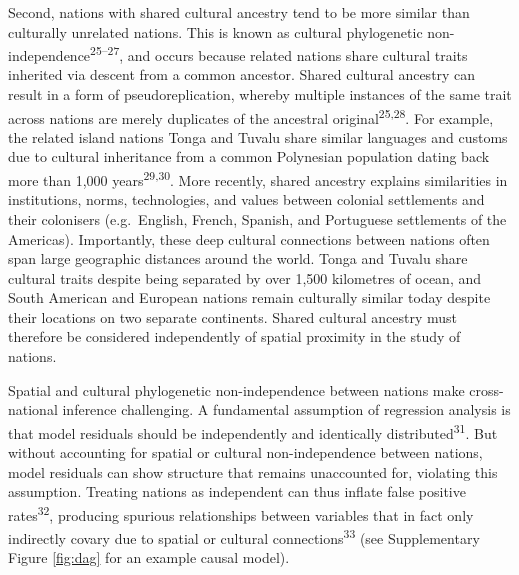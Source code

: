 \documentclass[
  man,floatsintext]{apa6}
\begin{document}
Second, nations with shared cultural ancestry tend to be more similar than culturally unrelated nations. This is known as cultural phylogenetic non-independence\textsuperscript{25--27}, and occurs because related nations share cultural traits inherited via descent from a common ancestor. Shared cultural ancestry can result in a form of pseudoreplication, whereby multiple instances of the same trait across nations are merely duplicates of the ancestral original\textsuperscript{25,28}. For example, the related island nations Tonga and Tuvalu share similar languages and customs due to cultural inheritance from a common Polynesian population dating back more than 1,000 years\textsuperscript{29,30}. More recently, shared ancestry explains similarities in institutions, norms, technologies, and values between colonial settlements and their colonisers (e.g.~English, French, Spanish, and Portuguese settlements of the Americas). Importantly, these deep cultural connections between nations often span large geographic distances around the world. Tonga and Tuvalu share cultural traits despite being separated by over 1,500 kilometres of ocean, and South American and European nations remain culturally similar today despite their locations on two separate continents. Shared cultural ancestry must therefore be considered independently of spatial proximity in the study of nations.

Spatial and cultural phylogenetic non-independence between nations make cross-national inference challenging. A fundamental assumption of regression analysis is that model residuals should be independently and identically distributed\textsuperscript{31}. But without accounting for spatial or cultural non-independence between nations, model residuals can show structure that remains unaccounted for, violating this assumption. Treating nations as independent can thus inflate false positive rates\textsuperscript{32}, producing spurious relationships between variables that in fact only indirectly covary due to spatial or cultural connections\textsuperscript{33} (see Supplementary Figure \ref{fig:dag} for an example causal model).
\end{document}
